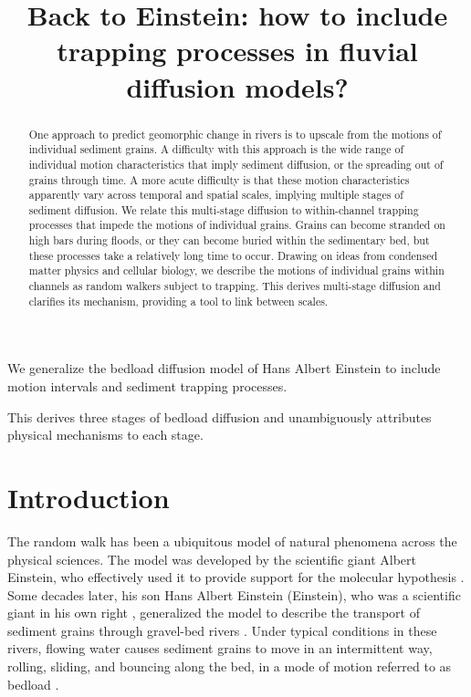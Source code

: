 \documentclass[]{agujournal2018}
\begin{document}
\title{Back to Einstein: how to include trapping processes in fluvial diffusion models?}


\begin{keypoints}
\item We generalize the bedload diffusion model of Hans Albert Einstein to include motion intervals and sediment trapping processes.
\item This derives three stages of bedload diffusion and unambiguously attributes physical mechanisms to each stage.
\end{keypoints}

\begin{abstract}
One approach to predict geomorphic change in rivers is to upscale from the motions of individual sediment grains. A difficulty with this approach is the wide range of individual motion characteristics that imply sediment diffusion, or the spreading out of grains through time. A more acute difficulty is that these motion characteristics apparently vary across temporal and spatial scales, implying multiple stages of sediment diffusion. We relate this multi-stage diffusion to within-channel trapping processes that impede the motions of individual grains. Grains can become stranded on high bars during floods, or they can become buried within the sedimentary bed, but these processes take a relatively long time to occur. Drawing on ideas from condensed matter physics and cellular biology, we describe the motions of individual grains within channels as random walkers subject to trapping. This derives multi-stage diffusion and clarifies its mechanism, providing a tool to link between scales.
\end{abstract}

\section{Introduction}
The random walk has been a ubiquitous model of natural phenomena across the physical sciences.
The model was developed by the scientific giant Albert Einstein, who effectively used it to provide support for the molecular hypothesis \citep{Einstein1905}.
Some decades later, his son Hans Albert Einstein (Einstein), who was a scientific giant in his own right \citep[e.g.][]{Ettema2004a}, generalized the model to describe the transport of sediment grains through gravel-bed rivers \citep{Einstein1937}.
Under typical conditions in these rivers, flowing water causes sediment grains to move in an intermittent way, rolling, sliding, and bouncing along the bed, in a mode of motion referred to as bedload \citep{Bagnold1973}.
\end{document}
